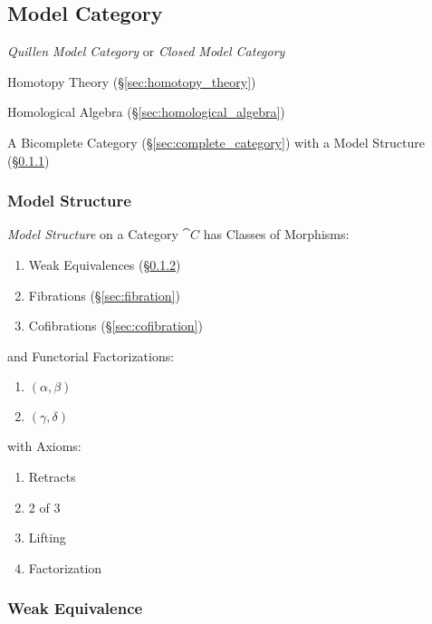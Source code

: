\subsection{Model Category}\label{sec:model_category}

\emph{Quillen Model Category} or \emph{Closed Model Category}

Homotopy Theory (\S\ref{sec:homotopy_theory})

Homological Algebra (\S\ref{sec:homological_algebra})

A Bicomplete Category (\S\ref{sec:complete_category}) with a Model
Structure (\S\ref{sec:model_structure})



\subsubsection{Model Structure}\label{sec:model_structure}

\emph{Model Structure} on a Category $\cat{C}$ has Classes of
Morphisms:
\begin{enumerate}
  \item Weak Equivalences (\S\ref{sec:weak_equivalence})
  \item Fibrations (\S\ref{sec:fibration})
  \item Cofibrations (\S\ref{sec:cofibration})
\end{enumerate}
and Functorial Factorizations:
\begin{enumerate}
  \item $(\alpha,\beta)$
  \item $(\gamma,\delta)$
\end{enumerate}
with Axioms:
\begin{enumerate}
  \item Retracts
  \item 2 of 3
  \item Lifting
  \item Factorization
\end{enumerate} %




\subsubsection{Weak Equivalence}\label{sec:weak_equivalence}



